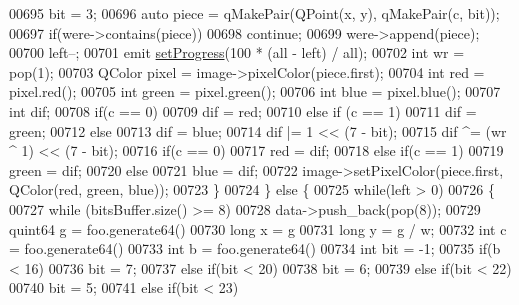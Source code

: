 \begin{DoxyCode}
00695                 bit = 3;
00696             \textcolor{keyword}{auto} piece = qMakePair(QPoint(x, y), qMakePair(c, bit));
00697             \textcolor{keywordflow}{if}(were->contains(piece))
00698                 \textcolor{keywordflow}{continue};
00699             were->append(piece);
00700             left--;
00701             emit \hyperlink{class_model_p_c_afdcd80f0ed5062e145a71f09b0897547}{setProgress}(100 * (all - left) / all);
00702             \textcolor{keywordtype}{int} wr = pop(1);
00703             QColor pixel = image->pixelColor(piece.first);
00704             \textcolor{keywordtype}{int} red = pixel.red();
00705             \textcolor{keywordtype}{int} green = pixel.green();
00706             \textcolor{keywordtype}{int} blue = pixel.blue();
00707             \textcolor{keywordtype}{int} dif;
00708             \textcolor{keywordflow}{if}(c == 0)
00709                 dif = red;
00710             \textcolor{keywordflow}{else} \textcolor{keywordflow}{if} (c == 1)
00711                 dif = green;
00712             \textcolor{keywordflow}{else}
00713                 dif = blue;
00714             dif |= 1 << (7 - bit);
00715             dif ^= (wr ^ 1) << (7 - bit);
00716             \textcolor{keywordflow}{if}(c == 0)
00717                 red = dif;
00718             \textcolor{keywordflow}{else} \textcolor{keywordflow}{if}(c == 1)
00719                 green = dif;
00720             \textcolor{keywordflow}{else}
00721                 blue = dif;
00722             image->setPixelColor(piece.first, QColor(red, green, blue));
00723         \}
00724     \} \textcolor{keywordflow}{else} \{
00725         \textcolor{keywordflow}{while}(left > 0)
00726         \{
00727             \textcolor{keywordflow}{while} (bitsBuffer.size() >= 8)
00728                 data->push\_back(pop(8));
00729             quint64 g = foo.generate64() %
00730             \textcolor{keywordtype}{long} x = g %
00731             \textcolor{keywordtype}{long} y = g / w;
00732             \textcolor{keywordtype}{int} c = foo.generate64() %
00733             \textcolor{keywordtype}{int} b = foo.generate64() %
00734             \textcolor{keywordtype}{int} bit = -1;
00735             \textcolor{keywordflow}{if}(b < 16)
00736                 bit = 7;
00737             \textcolor{keywordflow}{else} \textcolor{keywordflow}{if}(bit < 20)
00738                 bit = 6;
00739             \textcolor{keywordflow}{else} \textcolor{keywordflow}{if}(bit < 22)
00740                 bit = 5;
00741             \textcolor{keywordflow}{else} \textcolor{keywordflow}{if}(bit < 23)

\end{DoxyCode}
